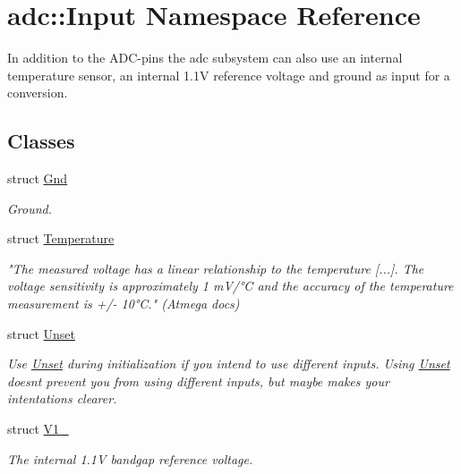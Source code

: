 \hypertarget{namespaceadc_1_1Input}{}\section{adc\+:\+:Input Namespace Reference}
\label{namespaceadc_1_1Input}


In addition to the A\+D\+C-\/pins the adc subsystem can also use an internal temperature sensor, an internal 1.\+1V reference voltage and ground as input for a conversion.  


\subsection*{Classes}
\begin{DoxyCompactItemize}
\item 
struct \hyperlink{structadc_1_1Input_1_1Gnd}{Gnd}
\begin{DoxyCompactList}\small\item\em Ground. \end{DoxyCompactList}\item 
struct \hyperlink{structadc_1_1Input_1_1Temperature}{Temperature}
\begin{DoxyCompactList}\small\item\em "The measured voltage has a linear relationship to the temperature \mbox{[}...\mbox{]}. The voltage sensitivity is approximately 1 m\+V/°C and the accuracy of the temperature measurement is +/-\/ 10°C." (Atmega docs) \end{DoxyCompactList}\item 
struct \hyperlink{structadc_1_1Input_1_1Unset}{Unset}
\begin{DoxyCompactList}\small\item\em Use \hyperlink{structadc_1_1Input_1_1Unset}{Unset} during initialization if you intend to use different inputs. Using \hyperlink{structadc_1_1Input_1_1Unset}{Unset} doesn\textquotesingle{}t prevent you from using different inputs, but maybe makes your intentations clearer. \end{DoxyCompactList}\item 
struct \hyperlink{structadc_1_1Input_1_1V1__1}{V1\+\_}
\begin{DoxyCompactList}\small\item\em The internal 1.\+1V bandgap reference voltage. \end{DoxyCompactList}\end{DoxyCompactItemize}


